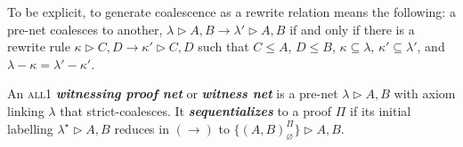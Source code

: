 \documentclass[UKenglish]{lipics-v2016}
\makeatletter
\theoremstyle{plain}
\newcommand\defn[1]{\textit{\textbf{#1}}}
\newcommand\all{\textsc{all}}
\newcommand\+{+}
\renewcommand\*{\times}
\newcommand\seq[3][]{{\vdash_{#1}}#2,#3}
\newcommand\net[3]{#1\triangleright #2,#3}
\newcommand\coh{\smallfrown}
\newcommand\join{\vee}
\newcommand\link[3][\sigma]{(#2,#3)_{#1}}
\newcommand\scoal{\rightarrow} %
\newcommand\ucoal{\rightsquigarrow}
\newcommand\srr[1]{
  \ifx#1+\expandafter\@srr\else
  \ifx#1*\*\mathrm S\else
  \ifx#1!\forall\mathrm S\else
  \ifx#1?\exists\mathrm S\else 
  \ifx#11\mathrm{axS}\else
  #1\mathrm S  \fi\fi\fi\fi\fi
}
\newcommand\@srr[1]{+_{#1}\mathrm S}
\newcommand\urr[1]{
  \ifx#1+\expandafter\@urr\else
  \ifx#1*\*\mathrm U\else
  \ifx#1!\forall\mathrm U\else
  \ifx#1?\exists\mathrm U\else 
  \ifx#11\mathrm{axU}\else
  #1\mathrm U
  \fi\fi\fi\fi\fi
}
\newcommand\@urr[1]{+_{#1}\mathrm U}
\makeatother
\begin{document}
To be explicit, to generate coalescence as a rewrite relation means the following: a pre-net coalesces to another, $\net\lambda AB\scoal \net{\lambda'}AB$ if and only if there is a rewrite rule $\net\kappa CD\scoal\net{\kappa'} CD$ such that $C\leq A$, $D\leq B$, $\kappa\subseteq\lambda$, $\kappa'\subseteq\lambda'$, and $\lambda-\kappa=\lambda'-\kappa'$.






\begin{definition}
An \all1 \defn{witnessing proof net} or \defn{witness net} is a pre-net $\net\lambda AB$ with axiom linking $\lambda$ that strict-coalesces. It \defn{sequentializes} to a proof $\Pi$ if its initial labelling $\net{\lambda^\star}AB$ reduces in $(\scoal)$ to $\net{\{\link[\varnothing]AB^\Pi\}}AB$.
\end{definition}
\end{document}
